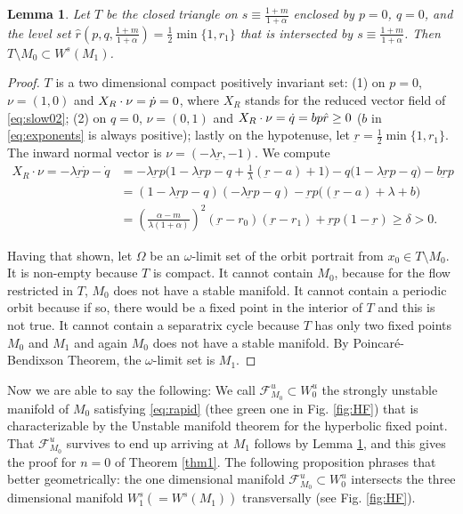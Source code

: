 \documentclass[a4paper,11pt]{article}
\def\blue{\color{blue}}
\newtheorem{lemma}{Lemma}[section]
\theoremstyle{remark}
\begin{document}
\begin{lemma} \label{lem:T}
 Let $T$ be the closed triangle on $s\equiv \frac{1+m}{1+\alpha}$ enclosed by $p=0$, $q=0$, and the level set $\hat{r}(p,q,\frac{1+m}{1+\alpha})= \frac{1}{2}\min\{1,r_1\}$ that is intersected by $s\equiv \frac{1+m}{1+\alpha}$. 
 Then $T\setminus M_0 \subset W^s(M_1)$.
\end{lemma}
\begin{proof}
$T$ is a two dimensional compact positively invariant set: (1) on $p=0$, $\nu = (1,0)$ and $X_R\cdot\nobreak\nu = \dot{p}=0$, where $X_R$ stands for the reduced vector field of \eqref{eq:slow02};
 (2) on $q=0$, $\nu = (0,1)$ and $X_R\cdot\nobreak\nu=\dot{q} = bp\hat{r}\ge0$ ($b$ in \eqref{eq:exponents} is always positive); lastly on the hypotenuse, let $\underbar{r}=\frac{1}{2}\min\{1,r_1\}$. The inward normal vector is $\nu = (-\lambda\underbar{r}, -1)$. We compute
  \begin{align}
  X_R\cdot\nu=-\lambda\underbar{r}\dot{p} -\dot{q}&= -\lambda \underbar{r}p \Big(1-\lambda \underbar{r}p -q + \frac{1}{\lambda}(\underbar{r}-a)+1\Big) - q(1-\lambda \underbar{r}p -q\big) - b \underbar{r}p \nonumber\\
  &= (1-\lambda \underbar{r}p -q)(-\lambda \underbar{r}p -q) -\underbar{r}p\Big((\underbar{r}-a)+\lambda+b\Big)\nonumber\\
  &= \left(\frac{\alpha-m}{\lambda(1+\alpha)}\right)^2(\underbar{r}-r_0)(\underbar{r}-r_1)+\underbar{r}p(1-\underbar{r})\ge \delta>0. \label{eq:affine}
 \end{align}

Having that shown, let $\Omega$ be an $\omega$-limit set of the orbit portrait from $x_0\in T\setminus M_0$. It is non-empty because $T$ is compact. It cannot contain $M_0$, because for the flow restricted in $T$, $M_0$ does not have {\blue a stable manifold}. It cannot contain a periodic orbit because if so, there would be a fixed point in the interior of $T$ and this is not true. 
It cannot contain a separatrix cycle because $T$ has only two fixed points $M_0$ and $M_1$ and again $M_0$ does not have {\blue a stable manifold}.  By Poincar\'e-Bendixson Theorem, the $\omega$-limit set is $M_1$.
\end{proof}


Now we are able to say the following: We call $\mathcal{F}^u_{M_0}\subset W^u_0$ {\blue the strongly unstable manifold} of $M_0$ satisfying \eqref{eq:rapid} (thee green one in Fig. \ref{fig:HF}) that is characterizable by the Unstable manifold theorem for the hyperbolic fixed point. That $\mathcal{F}^u_{M_0}$ survives to end up arriving at $M_1$ follows by Lemma \ref{lem:T}, and this gives the proof for $n=0$ of Theorem \ref{thm1}. The following proposition phrases that better geometrically: the one dimensional manifold $\mathcal{F}^u_{M_0}\subset W^u_0$ intersects the three dimensional manifold $W_1^s(=W^s(M_1))$ transversally (see Fig. \ref{fig:HF}).
\end{document}
